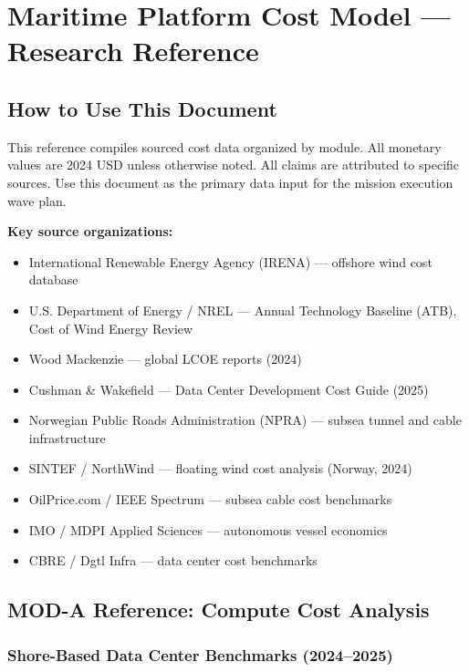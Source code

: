 \documentclass[11pt,letterpaper]{article}
\begin{document}
\section{Maritime Platform Cost Model --- Research Reference}

\subsection{How to Use This Document}

This reference compiles sourced cost data organized by module. All monetary values are
2024 USD unless otherwise noted. All claims are attributed to specific sources. Use
this document as the primary data input for the mission execution wave plan.

\textbf{Key source organizations:}
\begin{itemize}[itemsep=2pt]
  \item International Renewable Energy Agency (IRENA) --- offshore wind cost database
  \item U.S. Department of Energy / NREL --- Annual Technology Baseline (ATB), Cost of Wind Energy Review
  \item Wood Mackenzie --- global LCOE reports (2024)
  \item Cushman \& Wakefield --- Data Center Development Cost Guide (2025)
  \item Norwegian Public Roads Administration (NPRA) --- subsea tunnel and cable infrastructure
  \item SINTEF / NorthWind --- floating wind cost analysis (Norway, 2024)
  \item OilPrice.com / IEEE Spectrum --- subsea cable cost benchmarks
  \item IMO / MDPI Applied Sciences --- autonomous vessel economics
  \item CBRE / Dgtl Infra --- data center cost benchmarks
\end{itemize}

\subsection{MOD-A Reference: Compute Cost Analysis}

\subsubsection{Shore-Based Data Center Benchmarks (2024--2025)}
\end{document}
